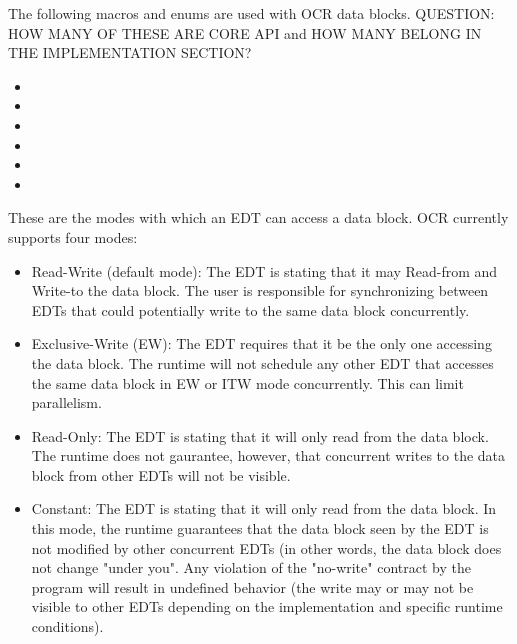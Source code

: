 The following macros and enums  are used with OCR data blocks.  QUESTION: HOW MANY OF THESE
ARE CORE API and HOW MANY BELONG IN THE IMPLEMENTATION SECTION?
\begin{itemize}
\item {}
\item {}
\item {}
\item {}
\item {}
\item {}
\end{itemize}


These are the modes with which an EDT can access a data block. OCR currently supports four
modes:
\begin{itemize}
\item {}  Read-Write (default mode): The EDT is stating that it may Read-from and Write-to the
data block.   The user is responsible for synchronizing between EDTs that could potentially write to
the same data block concurrently.
\item {}  Exclusive-Write (EW): The EDT requires that it be the only one accessing the data block. The
runtime will not schedule any other EDT that accesses the same data block in EW or ITW mode
concurrently. This can limit parallelism.
\item {}   Read-Only: The EDT is stating that it will only read from the data block.
The runtime does not gaurantee, however, that concurrent writes to the data block from other
EDTs will not be visible.
\item {}  Constant: The EDT is stating that it will only read from the data block. In this mode, the
runtime guarantees that the data block seen by the EDT is not modified by other concurrent
EDTs (in other words, the data block does not change "under you". Any violation of the
"no-write" contract by the program will result in undefined behavior (the write may or may not
be visible to other EDTs depending on the implementation and specific runtime conditions). \\
\end{itemize}

